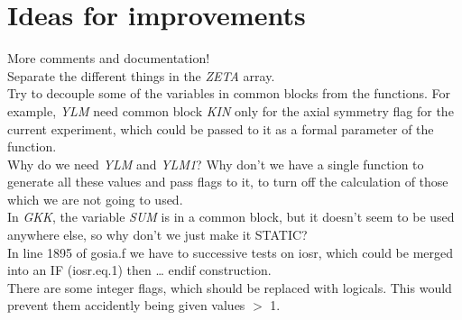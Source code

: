 \chapter{Ideas for improvements}

More comments and documentation!\\

Separate the different things in the {\em ZETA} array.\\

Try to decouple some of the variables in common blocks from the functions.
For example, {\em YLM} need common block {\em KIN} only for the axial
symmetry flag for the current experiment, which could be passed to it as a
formal parameter of the function.\\

Why do we need {\em YLM} and {\em YLM1}? Why don't we have a single function
to generate all these values and pass flags to it, to turn off the
calculation of those which we are not going to used.\\

In {\em GKK}, the variable {\em SUM} is in a common block, but it doesn't
seem to be used anywhere else, so why don't we just make it STATIC?\\

In line 1895 of gosia.f we have to successive tests on iosr, which could be
merged into an IF (iosr.eq.1) then {\ldots} endif construction.\\

There are some integer flags, which should be replaced with logicals. This
would prevent them accidently being given values $>$ 1.\\

